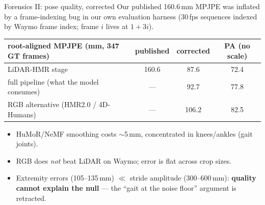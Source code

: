 \documentclass[10pt,aspectratio=169]{beamer}
\newcommand{\ok}[1]{\textcolor{good}{#1}}
\newcommand{\no}[1]{\textcolor{bad}{#1}}
\begin{document}
\begin{frame}{Forensics II: pose quality, corrected}
Our published 160.6\,mm MPJPE was inflated by a frame-indexing bug in our own evaluation
harness (30\,fps sequences indexed by Waymo frame index; frame $i$ lives at $1{+}3i$).
\begin{center}\small
\begin{tabular}{lccc}
\toprule
root-aligned MPJPE (mm, 347 GT frames) & published & \textbf{corrected} & PA (no scale) \\
\midrule
LiDAR-HMR stage & 160.6 & \ok{87.6} & 72.4 \\
full pipeline (what the model consumes) & --- & 92.7 & 77.8 \\
RGB alternative (HMR2.0 / 4D-Humans) & --- & \no{106.2} & 82.5 \\
\bottomrule
\end{tabular}
\end{center}
\begin{itemize}
  \item HuMoR/NeMF smoothing costs $\sim$5\,mm, concentrated in knees/ankles (gait joints).
  \item RGB does \emph{not} beat LiDAR on Waymo; error is flat across crop sizes.
  \item Extremity errors (105--135\,mm) $\ll$ stride amplitude (300--600\,mm):
        \textbf{quality cannot explain the null} --- the ``gait at the noise floor'' argument is retracted.
\end{itemize}
\end{frame}
\end{document}
